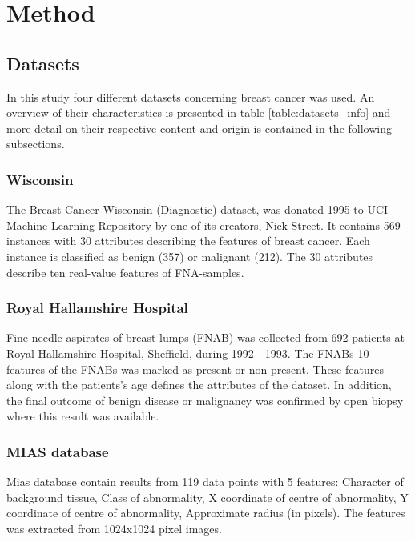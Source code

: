 \chapter{Method}

\section{Datasets}
\label{sec:Datasets}
In this study four different datasets concerning breast cancer was used. An overview of their characteristics is presented in table \ref{table:datasets_info} and more detail on their respective content and origin is contained in the following subsections.


\subsection{Wisconsin}

The Breast Cancer Wisconsin (Diagnostic) dataset, was donated 1995 to UCI  Machine Learning Repository \parencite{dua:2017} by one of its creators, Nick Street. It contains 569 instances with 30 attributes describing the features of breast cancer. Each instance is classified as benign (357) or malignant (212). The 30 attributes describe ten real-value features of FNA-samples.

\subsection{Royal Hallamshire Hospital}

Fine needle aspirates of breast lumps (FNAB) was collected from 692 patients at Royal Hallamshire Hospital, Sheffield, during 1992 - 1993. The FNABs 10 features of the FNABs was marked as present or non present. These features along with the patients's age defines the attributes of the dataset. In addition, the final outcome of benign disease or malignancy was confirmed by open biopsy where this result was available.

\subsection{MIAS database}

Mias database contain results from 119 data points with 5 features: Character of background tissue, Class of abnormality, X coordinate of centre of abnormality, Y coordinate of centre of abnormality, Approximate radius (in pixels). The features was extracted from 1024x1024 pixel images.

